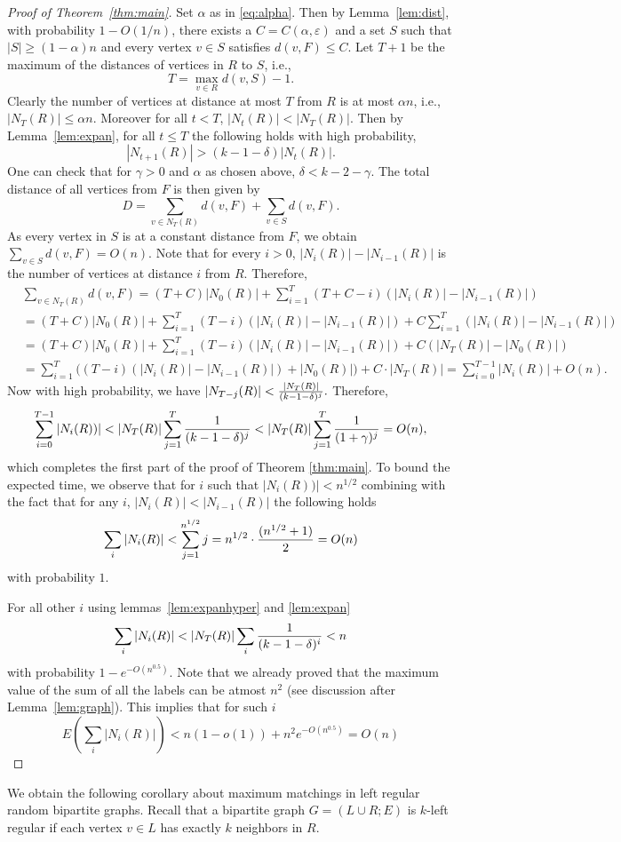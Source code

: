 \begin{proof}[Proof of Theorem~\ref{thm:main}]
Set $\alpha$ as in \eqref{eq:alpha}.
Then by Lemma~\ref{lem:dist}, with probability $1-O(1/n)$, there exists a $C=C(\alpha, \varepsilon)$ and a set $S$  such that $|S| \ge (1-\alpha)n$ and every vertex $v\in S$ satisfies $d(v,F)\le C.$
Let $T+1$ be the maximum of the distances of vertices in $R$ to $S$, i.e.,
\[ T = \max_{v \in R} d(v,S) -1 .\]
Clearly the number of vertices at distance at most $T$ from $R$ is at most $\alpha n$, i.e., $|N_T(R)|\le \alpha n$. 
Moreover for all $t<T$, $|N_t(R)| < |N_T(R)|$. 
Then by Lemma~\ref{lem:expan}, for all $t\le T$ the following holds with high probability,
\[ |N_{t+1}(R)| >  \left(k-1- \delta\right)| N_t(R)|.\]
One can check that for $\gamma >0$ and $\alpha$ as chosen above, $ \delta < k-2-\gamma.$
The total distance of all vertices from $F$ is then given by
 \[D=  \sum_{v\in N_{T}(R)} d(v,F) + \sum_{v\in S} d(v,F). \]
 As every vertex in $S$ is at a constant distance from $F$,  we obtain $\sum_{v\in S} d(v,F)=O(n)$.
 Note that for every $i>0$, $ | N_{i}(R)| - | N_{i-1}(R)|$ is the number of vertices at distance $i$ from $R$.
Therefore,
 \begin{align*}
 &\sum_{v\in N_{T}(R)} d(v,F)=  (T+C)|N_{0}(R)| + \sum _{i=1}^{T} (T+C-i)(| N_{i}(R)| - | N_{i-1}(R)|)\\
 &=(T+C)|N_{0}(R)| + \sum _{i=1}^{T} (T-i)(| N_{i}(R)| - | N_{i-1}(R)|) +C \sum _{i=1}^{T}( | N_{i}(R)| - | N_{i-1}(R)|)\\
 &=(T+C)|N_{0}(R)| + \sum _{i=1}^{T} (T-i)(| N_{i}(R)| - | N_{i-1}(R)|) +C ( | N_{T}(R)| - | N_{0}(R)|)\\
 &= \sum _{i=1}^{T} \bigg((T-i)(| N_{i}(R)| - | N_{i-1}(R)|) +|N_0(R)|\bigg)+C \cdot | N_{T}(R)| =\sum _{i=0}^{T-1} |N_i(R)| + O(n).
 \end{align*} 
Now with high probability, we have $|N_{T-j}(R) | <    {| N_{T}(R)| \over (k-1-\delta)^j } .
$ 
Therefore,
\[
\sum _{i=0}^{T-1}| N_i(R)) |< |N_{T}(R)|  \sum_{j=1}^{T}   {1 \over (k-1-\delta)^j }  <  |N_{T}(R)|  \sum_{j=1}^{T}   {1 \over (1+\gamma)^j } =O(n),\]
which completes the first part of the proof of Theorem \ref{thm:main}. 
To bound the expected time, we observe that for $i$ such that $|N_i(R))|< n^{1/2}$ combining with the fact that for any $i$, $|N_i(R)|< |N_{i-1}(R)|$  the following holds
$$\sum_{i}|N_i(R)|< \sum_{j=1}^{n^{1/2}}j = n^{1/2}\cdot {(n^{1/2} +1) \over 2}= O(n)$$
with probability $1$.

For all other $i$ using lemmas~\ref{lem:expanhyper} and \ref{lem:expan}
$$\sum_{i}|N_i(R)| < |N_{T}(R)|  \sum_i {1 \over (k-1-\delta)^i} < n $$ with probability $1-e^{-O(n^{0.5})}$.
Note that we already proved that the maximum value of the sum of all the labels can be atmost $n^2$ (see discussion after Lemma~\ref{lem:graph}). This implies that for such $i$ 
$$E\left(\sum_{i}|N_i(R)|\right) < n (1-o(1)) + n^2 e^{-O(n^{0.5})} = O(n)$$

\end{proof}
We obtain the following corollary about maximum matchings in left regular random bipartite graphs. Recall that a bipartite graph $G=(L\cup R;E)$ is  $k$-left regular if each vertex $v\in L$ has exactly $k$ neighbors in $R$.

